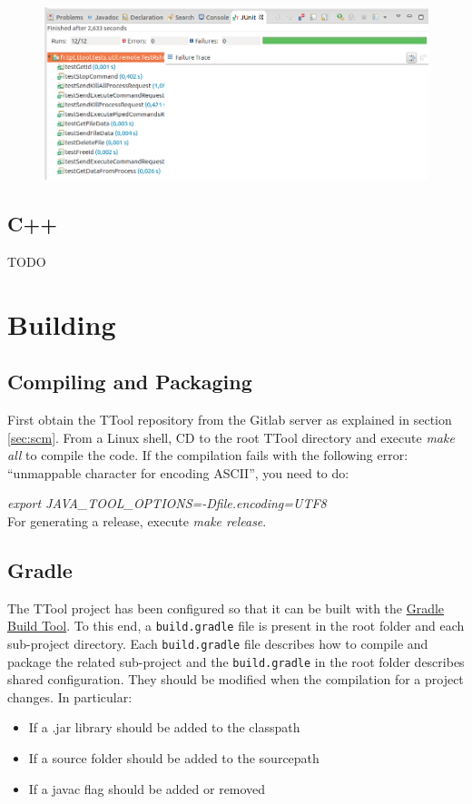 \documentclass[12pt]{article}
\begin{document}
\begin{figure}[H]
\begin{center}
\includegraphics[width=\textwidth]{images/image14.png}
\end{center}
\caption{}
\label{fig:image14}
\end{figure}

\subsection{C++}

TODO

\section{Building}

\subsection{Compiling and Packaging}

First obtain the TTool repository from the Gitlab server as explained in section
\ref{sec:scm}. From a Linux shell, CD to the root TTool directory and execute
\emph{make all} to compile the code. If the compilation fails with the following error:
``unmappable character for encoding ASCII'', you need to do:

\emph{export JAVA\_TOOL\_OPTIONS=-Dfile.encoding=UTF8} \\

For generating a release, execute \emph{make release}.

\subsection{Gradle}
The TTool project has been configured so that it can be built with the
\href{https://gradle.org/}{Gradle Build Tool}. To this end, a
\texttt{build.gradle} file
is present in the root folder and each sub-project directory. Each
\texttt{build.gradle} file describes how to compile and package the related
sub-project and the \texttt{build.gradle} in the root folder describes shared
configuration. They should be modified when the compilation for a project
changes. In particular:
\begin{itemize}
    \item If a .jar library should be added to the classpath
    \item If a source folder should be added to the sourcepath
    \item If a javac flag should be added or removed
\end{itemize}
\end{document}
